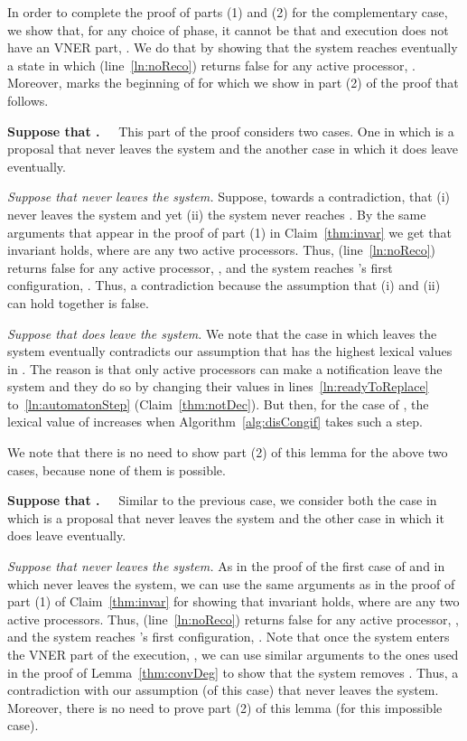 \documentclass[11pt]{article}
\newenvironment{proof}{\noindent{\bf Proof.}}{\hfill}
\begin{document}
\begin{proof}
In order to complete the proof of parts (1) and (2) for the complementary case, we show that, for any choice of phase, it cannot be that  and execution  does not have an VNER part, . We do that by showing that the system reaches eventually a state  in which  (line~\ref{ln:noReco}) returns false for any active processor, . Moreover,  marks the beginning of  for which we show in part (2) of the proof that  follows. 
    

\noindent \textbf{Suppose that .~~} This part of the proof considers two cases. One in which  is a proposal that never leaves the system and the another case in which it does leave eventually. 

\noindent  \textit{Suppose that  never leaves the system.}
Suppose, towards a contradiction, that (i)  never leaves the system and yet (ii) the system never reaches . By the same arguments that appear in the proof of part (1) in Claim~\ref{thm:invar} we get that invariant   
 holds, where  are any two active processors. Thus,  (line~\ref{ln:noReco}) returns false for any active processor, , and the system reaches 's first configuration, . Thus, a contradiction because the assumption that (i) and (ii) can hold together is false.

\noindent \textit{Suppose that  does leave the system.}
We note that the case in which  leaves the system eventually contradicts our assumption that  has the highest lexical values in . The reason is that only active processors can make a notification leave the system and they do so by changing their values in lines~\ref{ln:readyToReplace} to~\ref{ln:automatonStep} (Claim~\ref{thm:notDec}). But then, for the case of , the lexical value of  increases when Algorithm~\ref{alg:disCongif} takes such a step.

We note that there is no need to show part (2) of this lemma for the above two cases, because none of them is possible. 


\noindent \textbf{Suppose that .~~}
Similar to the previous case, we consider both the case in which  is a proposal that never leaves the system and the other case in which it does leave eventually. 

\noindent \textit{Suppose that  never leaves the system.}
As in the proof of the first case of   and in which  never leaves the system, we can use the same arguments as in the proof of part (1) of Claim~\ref{thm:invar} for showing that invariant   
 holds, where  are any two active processors. Thus,  (line~\ref{ln:noReco}) returns false for any active processor, , and the system reaches 's first configuration, . 
Note that once the system enters the VNER part of the execution, , we can use similar arguments to the ones used in the proof of Lemma~\ref{thm:convDeg} to show that the system removes . Thus, a contradiction with our assumption (of this case) that  never leaves the system. Moreover, there is no need to prove part (2) of this lemma (for this impossible case). 


\end{proof}
\end{document}
